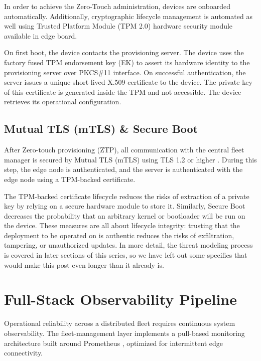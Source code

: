 \documentclass[conference]{IEEEtran}
\begin{document}
In order to achieve the Zero-Touch administration, devices are onboarded automatically. Additionally, cryptographic lifecycle management is automated as well using Trusted Platform Module (TPM 2.0) \cite{b19} hardware security module available in edge board.

On first boot, the device contacts the provisioning server. The device uses the factory fused TPM endorsement key (EK) to assert its hardware identity to the provisioning server over PKCS\#11 interface. On successful authentication, the server issues a unique short lived X.509 certificate to the device. The private key of this certificate is generated inside the TPM and not accessible. The device retrieves its operational configuration.

\subsection{Mutual TLS (mTLS) \& Secure Boot}
After Zero-touch provisioning (ZTP), all communication with the central fleet manager is secured by Mutual TLS (mTLS) using TLS 1.2 or higher \cite{b23}. During this step, the edge node is authenticated, and the server is authenticated with the edge node using a TPM-backed certificate.

The TPM-backed certificate lifecycle reduces the risks of extraction of a private key by relying on a secure hardware module to store it. Similarly, Secure Boot decreases the probability that an arbitrary kernel or bootloader will be run on the device. These measures are all about lifecycle integrity: trusting that the deployment to be operated on is authentic reduces the risks of exfiltration, tampering, or unauthorized updates. In more detail, the threat modeling process is covered in later sections of this series, so we have left out some specifics that would make this post even longer than it already is.

\section{Full-Stack Observability Pipeline}

Operational reliability across a distributed fleet requires continuous system observability. The fleet-management layer implements a pull-based monitoring architecture built around Prometheus \cite{b22}, optimized for intermittent edge connectivity.
\end{document}
